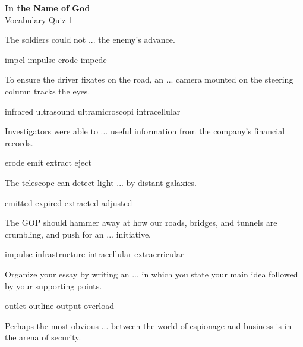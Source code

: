 \documentclass{exam}
\begin{document}
\begin{center}
\textbf{In the Name of God}\\ 
Vocabulary Quiz 1
\end{center}
\vspace{5mm}
\begin{questions}
\question The soldiers could not ... the enemy's advance.\\
\begin{oneparchoices}
 \choice impel
 \choice impulse
 \choice erode 
 \correctchoice impede
\end{oneparchoices}
\question To ensure the driver fixates on the road, an ... camera mounted on the steering column tracks the eyes.\\
\begin{oneparchoices}
 \correctchoice infrared 
 \choice ultrasound
 \choice ultramicroscopi
 \choice intracellular
\end{oneparchoices}
\question Investigators were able to ... useful information from the company's financial records.\\
\begin{oneparchoices}
 \choice erode
 \choice emit
 \correctchoice extract
 \choice eject
\end{oneparchoices}
\question The telescope can detect light ... by distant galaxies.\\
\begin{oneparchoices}
 \correctchoice emitted
 \choice expired 
 \choice extracted
 \choice adjusted
\end{oneparchoices}
\question The GOP should hammer away at how our roads, bridges, and tunnels are crumbling, and push for an ... initiative.\\
\begin{oneparchoices}
\choice impulse 
 \correctchoice infrastructure
 \choice intracellular
 \choice extracrricular
\end{oneparchoices}
\question Organize your essay by writing an ... in which you state your main idea followed by your supporting points.\\
\begin{oneparchoices}
\choice outlet
 \correctchoice outline
 \choice output
 \choice overload 
\end{oneparchoices}
\question Perhaps the most obvious ... between the world of espionage and business is in the arena of security.\\

\end{questions}
\end{document}
